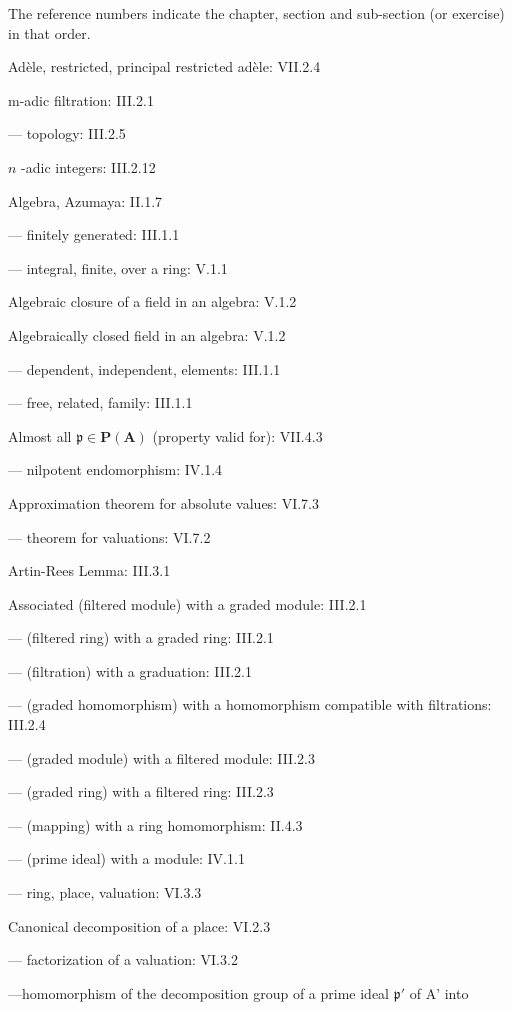 
The reference numbers indicate the chapter, section and sub-section (or exercise) in that order.

Adèle, restricted, principal restricted adèle: VII.2.4

m-adic filtration: III.2.1

--- topology: III.2.5

\(n\) -adic integers: III.2.12

Algebra, Azumaya: II.1.7

--- finitely generated: III.1.1

--- integral, finite, over a ring: V.1.1

Algebraic closure of a field in an algebra: V.1.2

Algebraically closed field in an algebra: V.1.2

--- dependent, independent, elements: III.1.1

--- free, related, family: III.1.1

Almost all \(\mathfrak{p} \in \mathbf{P}(\mathbf{A})\) (property valid for): VII.4.3

--- nilpotent endomorphism: IV.1.4

Approximation theorem for absolute values: VI.7.3

--- theorem for valuations: VI.7.2

Artin-Rees Lemma: III.3.1

Associated (filtered module) with a graded module: III.2.1

--- (filtered ring) with a graded ring: III.2.1

--- (filtration) with a graduation: III.2.1

--- (graded homomorphism) with a homomorphism compatible with filtrations: III.2.4

--- (graded module) with a filtered module: III.2.3

--- (graded ring) with a filtered ring: III.2.3

--- (mapping) with a ring homomorphism: II.4.3

--- (prime ideal) with a module: IV.1.1

--- ring, place, valuation: VI.3.3

Canonical decomposition of a place: VI.2.3

--- factorization of a valuation: VI.3.2

---homomorphism of the decomposition group of a prime ideal \(\mathfrak{p}'\) of A' into

